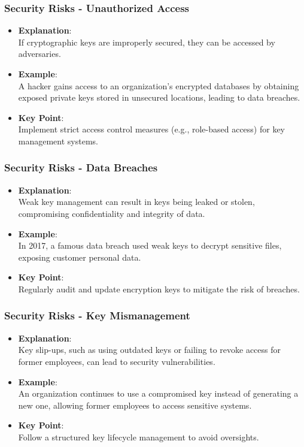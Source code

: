 \documentclass{beamer}
\begin{document}
\begin{frame}[fragile]
    \frametitle{Security Risks - Unauthorized Access}
    \begin{itemize}
        \item \textbf{Explanation}:
        \\ If cryptographic keys are improperly secured, they can be accessed by adversaries.
        \item \textbf{Example}:
        \\ A hacker gains access to an organization's encrypted databases by obtaining exposed private keys stored in unsecured locations, leading to data breaches.
        \item \textbf{Key Point}:
        \\ Implement strict access control measures (e.g., role-based access) for key management systems.
    \end{itemize}
\end{frame}

\begin{frame}[fragile]
    \frametitle{Security Risks - Data Breaches}
    \begin{itemize}
        \item \textbf{Explanation}:
        \\ Weak key management can result in keys being leaked or stolen, compromising confidentiality and integrity of data.
        \item \textbf{Example}:
        \\ In 2017, a famous data breach used weak keys to decrypt sensitive files, exposing customer personal data.
        \item \textbf{Key Point}:
        \\ Regularly audit and update encryption keys to mitigate the risk of breaches.
    \end{itemize}
\end{frame}

\begin{frame}[fragile]
    \frametitle{Security Risks - Key Mismanagement}
    \begin{itemize}
        \item \textbf{Explanation}:
        \\ Key slip-ups, such as using outdated keys or failing to revoke access for former employees, can lead to security vulnerabilities.
        \item \textbf{Example}:
        \\ An organization continues to use a compromised key instead of generating a new one, allowing former employees to access sensitive systems.
        \item \textbf{Key Point}:
        \\ Follow a structured key lifecycle management to avoid oversights.
    \end{itemize}
\end{frame}
\end{document}
